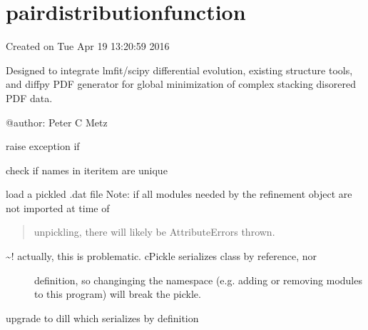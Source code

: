 \documentclass[letterpaper,10pt,english]{sphinxmanual}
\begin{document}
\section{pairdistributionfunction}
\label{\detokenize{rst/pairdistributionfunction:module-mstack.pairdistributionfunction}}\label{\detokenize{rst/pairdistributionfunction::doc}}\label{\detokenize{rst/pairdistributionfunction:pairdistributionfunction}}
Created on Tue Apr 19 13:20:59 2016

Designed to integrate lmfit/scipy differential evolution, existing structure
tools, and diffpy PDF generator for global minimization of complex stacking
disorered PDF data.

@author: Peter C Metz

\begin{fulllineitems}
\label{\detokenize{rst/pairdistributionfunction:mstack.pairdistributionfunction.not_implemented}}
raise exception if

\end{fulllineitems}


\begin{fulllineitems}
\label{\detokenize{rst/pairdistributionfunction:mstack.pairdistributionfunction.name_check}}
check if names in iteritem are unique

\end{fulllineitems}


\begin{fulllineitems}
\label{\detokenize{rst/pairdistributionfunction:mstack.pairdistributionfunction.load}}
load a pickled .dat file
Note: if all modules needed by the refinement object are not imported at time of
\begin{quote}

unpickling, there will likely be AttributeErrors thrown.
\end{quote}
\begin{description}
\item[{\textasciitilde{}! actually, this is problematic. cPickle serializes class by reference, nor}] \leavevmode
definition, so changinging the namespace (e.g. adding or removing modules
to this program) will break the pickle.

\end{description}

upgrade to dill which serializes by definition

\end{fulllineitems}
\end{document}
